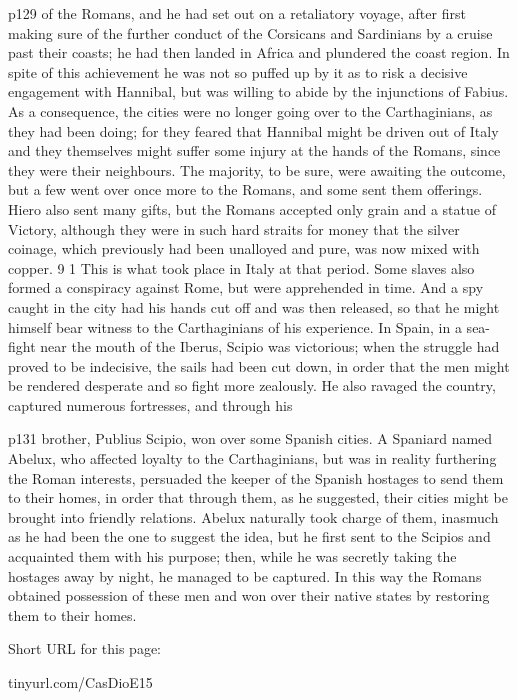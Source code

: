 p129 of the Romans, and he had set out on a retaliatory voyage, after first making sure of the further conduct of the Corsicans and Sardinians by a cruise past their coasts; he had then landed in Africa and plundered the coast region. In spite of this achievement he was not so puffed up by it as to risk a decisive engagement with Hannibal, but was willing to abide by the injunctions of Fabius. As a consequence, the cities were no longer going over to the Carthaginians, as they had been doing; for they feared that Hannibal might be driven out of Italy and they themselves might suffer some injury at the hands of the Romans, since they were their neighbours. The majority, to be sure, were awaiting the outcome, but a few went over once more to the Romans, and some sent them offerings. Hiero also sent many gifts, but the Romans accepted only grain and a statue of Victory, although they were in such hard straits for money that the silver coinage, which previously had been unalloyed and pure, was now mixed with copper. 9 1 This is what took place in Italy at that period. Some slaves also formed a conspiracy against Rome, but were apprehended in time. And a spy caught in the city had his hands cut off and was then released, so that he might himself bear witness to the Carthaginians of his experience. In Spain, in a sea-fight near the mouth of the Iberus, Scipio was victorious; when the struggle had proved to be indecisive, the sails had been cut down, in order that the men might be rendered desperate and so fight more zealously. He also ravaged the country, captured numerous fortresses, and through his

p131 brother, Publius Scipio, won over some Spanish cities. A Spaniard named Abelux, who affected loyalty to the Carthaginians, but was in reality furthering the Roman interests, persuaded the keeper of the Spanish hostages to send them to their homes, in order that through them, as he suggested, their cities might be brought into friendly relations. Abelux naturally took charge of them, inasmuch as he had been the one to suggest the idea, but he first sent to the Scipios and acquainted them with his purpose; then, while he was secretly taking the hostages away by night, he managed to be captured. In this way the Romans obtained possession of these men and won over their native states by restoring them to their homes.


Short URL for this page:

tinyurl.com/CasDioE15

